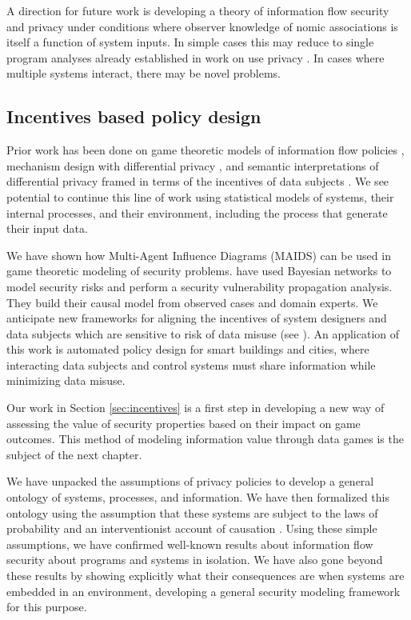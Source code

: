 \documentclass[../thesis.tex]{subfiles}
\begin{document}
A direction for future work is developing a
theory of information flow security and privacy
under conditions where observer knowledge of
nomic associations is itself a function of system
inputs. In simple cases this may reduce
to single program analyses already established
in work on use privacy \cite{datta2017use}.
In cases where multiple systems interact,
there may be novel problems.

\subsection{Incentives based policy design}

Prior work has been done on game theoretic
models of information flow policies \cite{barth07csf},
mechanism design with differential privacy
\cite{mcsherry2007mechanism}, and 
semantic interpretations of differential privacy
framed in terms of the incentives of data subjects
\cite{kasivisiwanathan14jpc}.
We see potential to continue this line of work
using statistical models of systems, their
internal processes, and their environment,
including the process that generate their
input data.

We have shown how Multi-Agent Influence Diagrams
(MAIDS) \cite{koller2003multi} can be used in
game theoretic modeling of security problems.
\citet{feng2014security} have used Bayesian networks
to model security risks and perform a security
vulnerability propagation analysis.
They build their causal model from observed cases
and domain experts.
We anticipate
new frameworks for aligning the incentives
of system designers and data subjects which
are sensitive to risk of data misuse (see
\cite{brooks15nist}).
An application of this work is automated policy
design for smart buildings and cities, where
interacting data subjects and control systems
must share information while minimizing data
misuse.

Our work in Section \ref{sec:incentives} is
a first step in developing a new way of assessing
the value of security properties based on
their impact on game outcomes.
This method of modeling information value through
data games is the subject of the next chapter.


\hfill
\hfill

We have unpacked the assumptions of privacy
policies to develop a general ontology of systems,
processes, and information.
We have then formalized this ontology using the
assumption that these systems are subject to
the laws of probability and an interventionist
account of causation \cite{woodward2005making}.
Using these simple assumptions, we have
confirmed well-known results about information
flow security about programs and systems in
isolation.
We have also gone beyond these results by showing
explicitly what their consequences are when
systems are embedded in an environment, developing
a general security modeling framework for this purpose.
\end{document}
